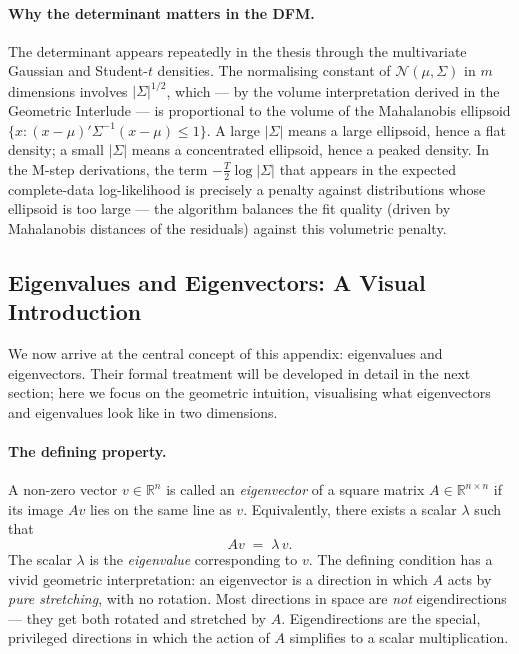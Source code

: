\documentclass[11pt, a4paper, oneside]{article}
\begin{document}
\paragraph{Why the determinant matters in the DFM.}
The determinant appears repeatedly in the thesis through the
multivariate Gaussian and Student-$t$ densities. The normalising
constant of $\mathcal{N}(\mu, \Sigma)$ in $m$ dimensions involves
$|\Sigma|^{1/2}$, which — by the volume interpretation derived in
the Geometric Interlude — is
proportional to the volume of the Mahalanobis ellipsoid
$\{x : (x-\mu)'\Sigma^{-1}(x-\mu) \leq 1\}$. A large $|\Sigma|$ means
a large ellipsoid, hence a flat density; a small $|\Sigma|$ means a
concentrated ellipsoid, hence a peaked density. In the M-step
derivations, the term $-\tfrac{T}{2}\log|\Sigma|$ that appears in the
expected complete-data log-likelihood is precisely a penalty against
distributions whose ellipsoid is too large — the algorithm balances
the fit quality (driven by Mahalanobis distances of the residuals)
against this volumetric penalty.

\subsection{Eigenvalues and Eigenvectors: A Visual Introduction}
\label{sec:appendix-eigen-visual}

We now arrive at the central concept of this appendix: eigenvalues
and eigenvectors. Their formal treatment will be developed in detail
in the next section; here we focus on the geometric intuition,
visualising what eigenvectors and eigenvalues look like in two
dimensions.

\paragraph{The defining property.}
A non-zero vector $v \in \mathbb{R}^n$ is called an
\emph{eigenvector} of a square matrix $A \in \mathbb{R}^{n \times n}$
if its image $A v$ lies on the same line as $v$. Equivalently, there
exists a scalar $\lambda$ such that
\[
A v \;=\; \lambda\, v.
\]
The scalar $\lambda$ is the \emph{eigenvalue} corresponding to $v$.
The defining condition has a vivid geometric interpretation: an
eigenvector is a direction in which $A$ acts by \emph{pure
stretching}, with no rotation. Most directions in space are
\emph{not} eigendirections — they get both rotated and stretched by
$A$. Eigendirections are the special, privileged directions in which
the action of $A$ simplifies to a scalar multiplication.
\end{document}
